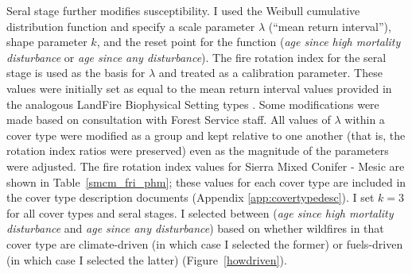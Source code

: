 \begin{itemize}
\begin{table}[htbp]
\end{table}

Seral stage further modifies susceptibility. I used the Weibull cumulative distribution function and specify a scale parameter $\lambda$ (``mean return interval''), shape parameter $k$, and the reset point for the function (\emph{age since high mortality disturbance} or \emph{age since any disturbance}). The fire rotation index for the seral stage is used as the basis for $\lambda$ and treated as a calibration parameter. These values were initially set as equal to the mean return interval values provided in the analogous LandFire Biophysical Setting types \citep{Landfire2007}. Some modifications were made based on consultation with Forest Service staff. All values of $\lambda$ within a cover type were modified as a group and kept relative to one another (that is, the rotation index ratios were preserved) even as the magnitude of the parameters were adjusted. The fire rotation index values for Sierra Mixed Conifer - Mesic are shown in Table~\ref{smcm_fri_phm}; these values for each cover type are included in the cover type description documents (Appendix \ref{app:covertypedesc}). I set $k=3$ for all cover types and seral stages. I selected between (\emph{age since high mortality disturbance} and \emph{age since any disturbance}) based on whether wildfires in that cover type are climate-driven (in which case I selected the former) or fuels-driven (in which case I selected the latter) (Figure~\ref{howdriven}).


\end{itemize}
